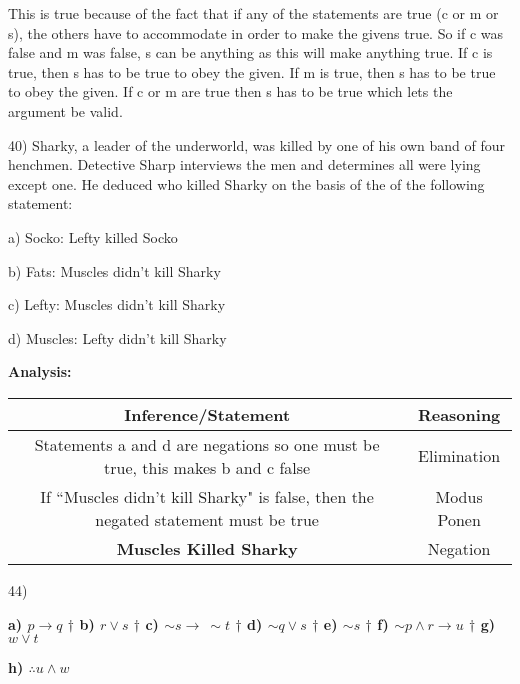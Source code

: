 \documentclass[11pt]{article}
\begin{document}
\begin{flushleft}
 This is true because of the fact that if any of the statements are true (c or m or s), the others have to accommodate in order to make the givens true. So if c was false and m was false, s can be anything as this will make anything true. If c is true, then s has to be true to obey the given. If m is true, then s has to be true to obey the given. If c or m are true then s has to be true which lets the argument be valid.
	

	\hrulefill
	
	
	40) Sharky, a leader of the underworld, was killed by one of his own band of four henchmen. Detective Sharp interviews the men and determines all were lying except one. He deduced who killed Sharky on the basis of the of the following statement:
	
	a) Socko: Lefty killed Socko
	
	b) Fats: Muscles didn't kill Sharky
	
	c) Lefty: Muscles didn't kill Sharky
	
	d) Muscles: Lefty didn't kill Sharky

	\textbf{Analysis: }
	\begin{center}
	\begin{tabular}{|c|c|} \hline
	Inference/Statement & Reasoning	\\ \hline
	Statements a and d are negations so one must be true, this makes b and c false & Elimination  \\ \hline
	
	If ``Muscles didn't kill Sharky" is false, then the negated statement must be true & Modus Ponen \\ \hline
	
	\textbf{Muscles Killed Sharky} & Negation\\ \hline
	
	
	\end{tabular}
	\end{center}	
	
	\hrulefill	
	
	
	44) 
	
	 \textbf{a) $p \to q$ $\dagger$ b) $r \lor s$ $\dagger$ c) $\sim s \to \  \sim t $ $\dagger$ d) $\sim q \lor s$ $\dagger$ e) $\sim s$ $\dagger$ f) $\sim p \land r \to u$ $\dagger$ g) $w \lor t$}
	
\textbf{h) $\therefore u \land w$}	
	
	\begin{center}
	\begin{tabular}{|l|c|} \hline
	

\end{tabular}
\end{center}
\end{flushleft}
\end{document}
